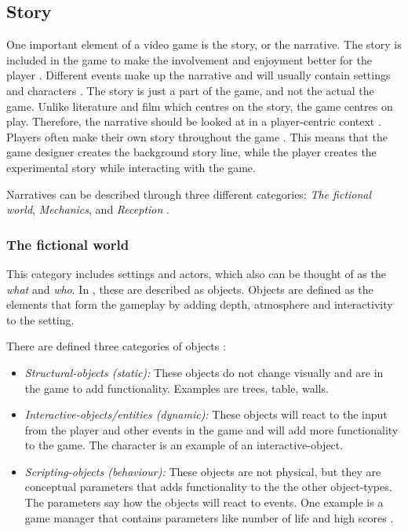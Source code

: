 \subsection{Story}
One important element of a video game is the story, or the narrative. The story is included in the game to make the involvement and enjoyment better for the player \cite{umlapproach}. Different events make up the narrative and will usually contain settings and characters \cite{understandingvg}. The story is just a part of the game, and not the actual the game. Unlike literature and film which centres on the story, the game centres on play. Therefore, the narrative should be looked at in a player-centric context \cite{gametheory}. Players often make their own story throughout the game \cite{umlapproach}. This means that the game designer creates the background story line, while the player creates the experimental story while interacting with the game. 

Narratives can be described through three different categories: \emph{The fictional world}, \emph{Mechanics}, and \emph{Reception} \cite{understandingvg}.

\subsubsection{The fictional world}
\label{subsub:fictionalworld}
This category includes settings and actors, which also can be thought of as the \emph{what} and \emph{who}. In \cite{beram}, these are described as objects. Objects are defined as the elements that form the gameplay by adding depth, atmosphere and interactivity to the setting.

There are defined three categories of objects \cite{beram}:
\begin{itemize}
\item \emph{Structural-objects (static):} These objects do not change visually and are in the game to add functionality. Examples are trees, table, walls.
\item \emph{Interactive-objects/entities (dynamic):} These objects will react to the input from the player and other events in the game and will add more functionality to the game. The character is an example of an interactive-object.
\item \emph{Scripting-objects (behaviour):} These objects are not physical, but they are conceptual parameters that adds functionality to the the other object-types. The parameters say how the objects will react to events. One example is a game manager that contains parameters like number of life and high scores \cite{umlapproach}. 
\end{itemize}

